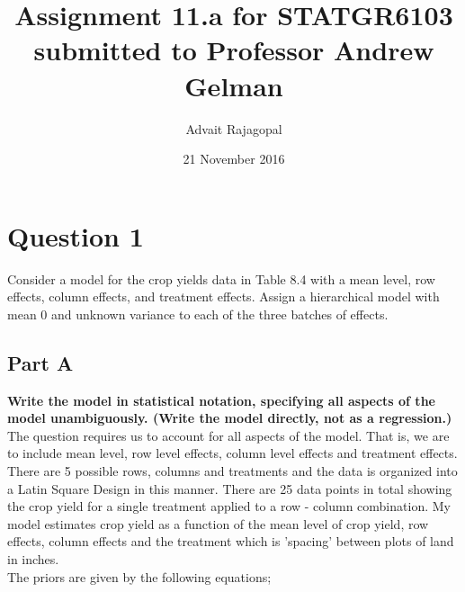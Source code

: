 \documentclass{article}
\title{Assignment 11.a for \textbf{STATGR6103}\\
\large submitted to Professor Andrew Gelman}
\date{21 November 2016}
\author{Advait Rajagopal}
\begin{document}
  \maketitle
\section{Question 1}
Consider a model for the crop yields data in Table 8.4 with a mean level, row effects, column effects, and treatment effects. Assign a hierarchical model with mean 0 and unknown variance to each of the three batches of effects.
\subsection{Part A}
\textbf{Write the model in statistical notation, specifying all aspects of the model unambiguously. (Write the model directly, not as a regression.)}\\
The question requires us to account for all aspects of the model. That is, we are to include mean level, row level effects, column level effects and treatment effects. There are 5 possible rows, columns and treatments and the data is organized into a Latin Square Design in this manner. There are 25 data points in total showing the crop yield for a single treatment applied to a row - column combination. My model estimates crop yield as a function of the mean level of crop yield, row effects, column effects and the treatment which is 'spacing' between plots of land in inches.\\
The priors are given by the following equations;
\end{document}
